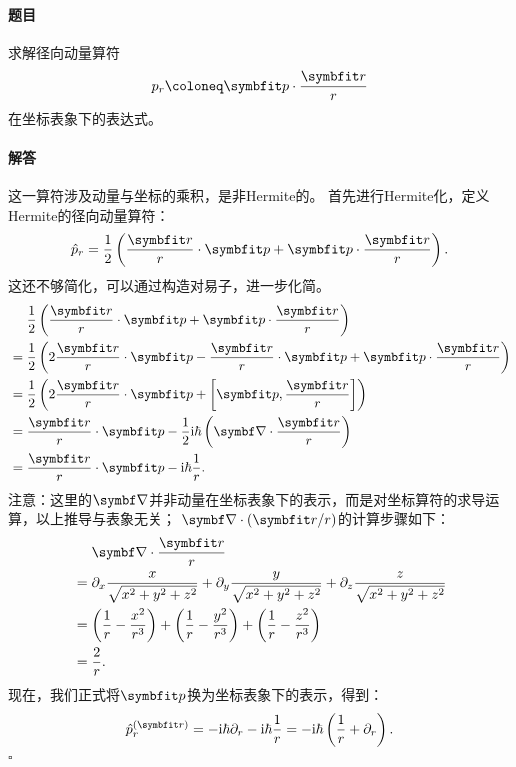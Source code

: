 \begin{tcolorbox}[breakable, title={\textbf{径向动量算符}}]
    \paragraph{题目}
    求解径向动量算符
    \begin{equation}
        p_r \coloneq \pp \cdot \frac{\rr}{r}
    \end{equation}
    在坐标表象下的表达式。

    \paragraph{解答}
    这一算符涉及动量与坐标的乘积，是非Hermite的。
    首先进行Hermite化，定义Hermite的径向动量算符：
    \begin{equation}
        \hat{p}_r = \frac12 \left( \frac{\rr}{r}\cdot\pp + \pp\cdot\frac{\rr}{r} \right).
    \end{equation}
    这还不够简化，可以通过构造对易子，进一步化简。
    \begin{equation}
    \begin{aligned}
        &\quad\ \frac12 \left( \frac{\rr}{r}\cdot\pp + \pp\cdot\frac{\rr}{r} \right) \\
        &= \frac12 \left( 2\frac{\rr}{r}\cdot\pp - \frac{\rr}{r}\cdot\pp + \pp\cdot\frac{\rr}{r} \right) \\
        &= \frac12 \left( 2\frac{\rr}{r}\cdot\pp + \left[\pp, \frac{\rr}{r}\right] \right) \\
        &= \frac{\rr}{r}\cdot\pp - \frac12\ii\hbar\left(\del\cdot\frac{\rr}{r}\right) \\
        &= \frac{\rr}{r}\cdot\pp - \ii\hbar\frac{1}{r}.
    \end{aligned}
    \end{equation}
    注意：这里的$\del$并非动量在坐标表象下的表示，而是对坐标算符的求导运算，以上推导与表象无关；
    $\del\cdot(\rr/r)$的计算步骤如下：
    \begin{equation}
    \begin{aligned}
        &\quad\ \del\cdot\frac{\rr}{r} \\
        &= \pd_x \frac{x}{\sqrt{x^2+y^2+z^2}} + \pd_y \frac{y}{\sqrt{x^2+y^2+z^2}} + \pd_z \frac{z}{\sqrt{x^2+y^2+z^2}} \\
        &= \left(\frac{1}{r} - \frac{x^2}{r^3}\right) + \left(\frac{1}{r} - \frac{y^2}{r^3}\right) + \left(\frac{1}{r} - \frac{z^2}{r^3}\right) \\
        &= \frac{2}{r}.
    \end{aligned}
    \end{equation}
    现在，我们正式将$\pp$换为坐标表象下的表示，得到：
    \begin{equation}
        \hat{p}^{(\rr)}_r = -\ii\hbar\pd_r - \ii\hbar\frac{1}{r} = -\ii\hbar\left(\frac{1}{r}+\pd_r\right).
    \end{equation}
    \hfill$\square$

\end{tcolorbox}

